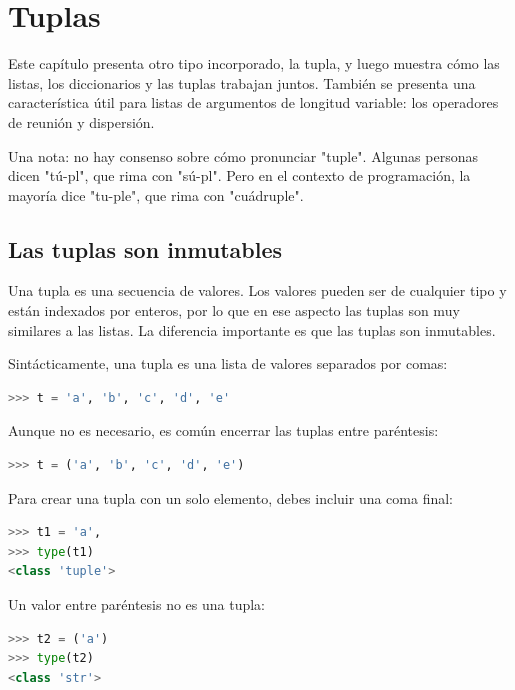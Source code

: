 
\chapter{Tuplas}

Este capítulo presenta otro tipo incorporado, la tupla, y luego muestra cómo las listas, los diccionarios y las tuplas trabajan juntos. También se presenta una característica útil para listas de argumentos de longitud variable: los operadores de reunión y dispersión.

Una nota: no hay consenso sobre cómo pronunciar "tuple". Algunas personas dicen "tú-pl", que rima con "sú-pl". Pero en el contexto de programación, la mayoría dice "tu-ple", que rima con "cuádruple".

\section{Las tuplas son inmutables}

Una tupla es una secuencia de valores. Los valores pueden ser de cualquier tipo y están indexados por enteros, por lo que en ese aspecto las tuplas son muy similares a las listas. La diferencia importante es que las tuplas son inmutables.

Sintácticamente, una tupla es una lista de valores separados por comas:

\begin{lstlisting}[language=Python]
>>> t = 'a', 'b', 'c', 'd', 'e'
\end{lstlisting}

Aunque no es necesario, es común encerrar las tuplas entre paréntesis:

\begin{lstlisting}[language=Python]
>>> t = ('a', 'b', 'c', 'd', 'e')
\end{lstlisting}

Para crear una tupla con un solo elemento, debes incluir una coma final:

\begin{lstlisting}[language=Python]
>>> t1 = 'a',
>>> type(t1)
<class 'tuple'>
\end{lstlisting}

Un valor entre paréntesis no es una tupla:

\begin{lstlisting}[language=Python]
>>> t2 = ('a')
>>> type(t2)
<class 'str'>
\end{lstlisting}

